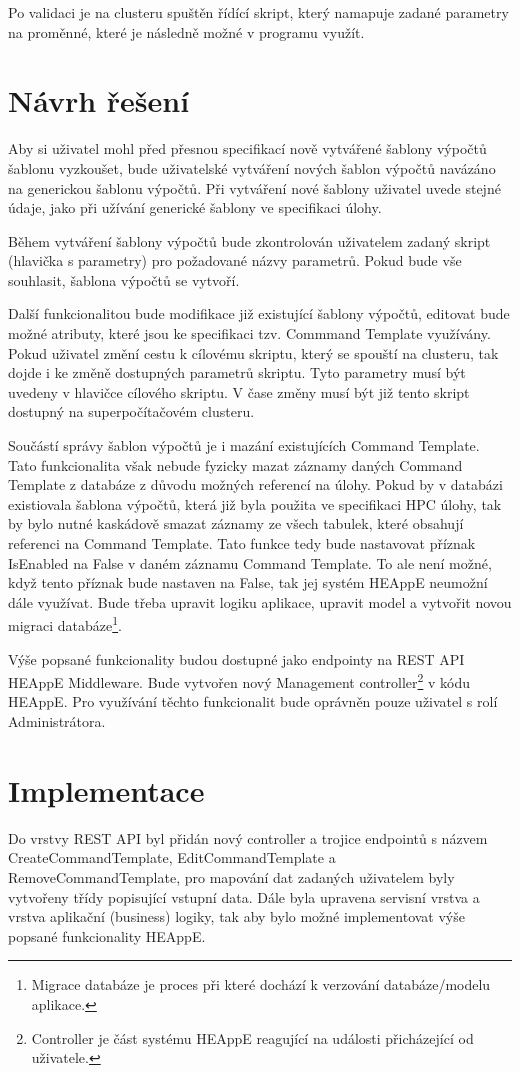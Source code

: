 Po validaci je na clusteru spuštěn řídící skript, který namapuje zadané parametry na proměnné, které je následně možné v programu využít.

\section{Návrh řešení}
Aby si uživatel mohl před přesnou specifikací nově vytvářené šablony výpočtů šablonu vyzkoušet, bude uživatelské vytváření nových šablon výpočtů navázáno na generickou šablonu výpočtů. Při vytváření nové šablony uživatel uvede stejné údaje, jako při užívání generické šablony ve specifikaci úlohy.

Během vytváření šablony výpočtů bude zkontrolován uživatelem zadaný skript (hlavička s parametry) pro požadované názvy parametrů. Pokud bude vše souhlasit, šablona výpočtů se vytvoří.

Další funkcionalitou bude modifikace již existující šablony výpočtů, editovat bude možné atributy, které jsou ke specifikaci tzv. Commmand Template využívány. Pokud uživatel změní cestu k cílovému skriptu, který se spouští na clusteru, tak dojde i ke změně dostupných parametrů skriptu. Tyto parametry musí být uvedeny v hlavičce cílového skriptu. V čase změny musí být již tento skript dostupný na superpočítačovém clusteru.

Součástí správy šablon výpočtů je i mazání existujících Command Template. Tato funkcionalita však nebude fyzicky mazat záznamy daných Command Template z databáze z důvodu možných referencí na úlohy. Pokud by v databázi existiovala šablona výpočtů, která již byla použita ve specifikaci HPC úlohy, tak by bylo nutné kaskádově smazat záznamy ze všech tabulek, které obsahují referenci na Command Template. Tato funkce tedy bude nastavovat příznak IsEnabled na False v daném záznamu Command Template. To ale není možné, když tento příznak bude nastaven na False, tak jej systém HEAppE neumožní dále využívat. Bude třeba upravit logiku aplikace, upravit model a vytvořit novou migraci databáze\footnote{Migrace databáze je proces při které dochází k verzování databáze/modelu aplikace.}.  

Výše popsané funkcionality budou dostupné jako endpointy na REST API HEAppE Middleware. Bude vytvořen nový Management controller\footnote{Controller je část systému HEAppE reagující na události přicházející od uživatele.} v kódu HEAppE. Pro využívání těchto funkcionalit bude oprávněn pouze uživatel s rolí Administrátora.

\section{Implementace}
Do vrstvy REST API byl přidán nový controller a trojice endpointů s názvem CreateCommandTemplate, EditCommandTemplate a RemoveCommandTemplate, pro mapování dat zadaných uživatelem byly vytvořeny třídy popisující vstupní data. Dále byla upravena servisní vrstva a vrstva aplikační (business) logiky, tak aby bylo možné implementovat výše popsané funkcionality HEAppE. 

